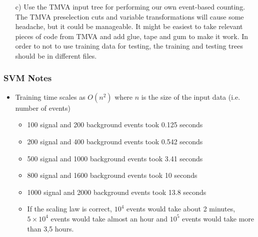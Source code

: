 \begin{itemize}
\begin{itemize}
\begin{enumerate}
    \item[c)] Use the TMVA input tree for performing our own
      event-based counting. The TMVA preselection cuts and variable
      transformations will cause some headache, but it could be
      manageable. It might be easiest to take relevant pieces of code
      from TMVA and add glue, tape and gum to make it work. In order
      to not to use training data for testing, the training and
      testing trees should be in different files.
    \end{enumerate}
  \end{itemize}
\end{itemize}

\subsubsection{SVM Notes}
\begin{itemize}
\item Training time scales as $O(n^2)$ where $n$ is the size of the
  input data (i.e. number of events)
  \begin{itemize}
  \item 100 signal and 200 background events took 0.125 seconds
  \item 200 signal and 400 background events took 0.542 seconds
  \item 500 signal and 1000 background events took 3.41 seconds
  \item 800 signal and 1600 background events took 10 seconds
  \item 1000 signal and 2000 background events took 13.8 seconds
  \item If the scaling law is correct, $10^4$ events would take about 2
    minutes, $5\times 10^4$ events would take almost an hour and $10^5$
    events would take more than 3,5 hours.
  \end{itemize}
\end{itemize}

